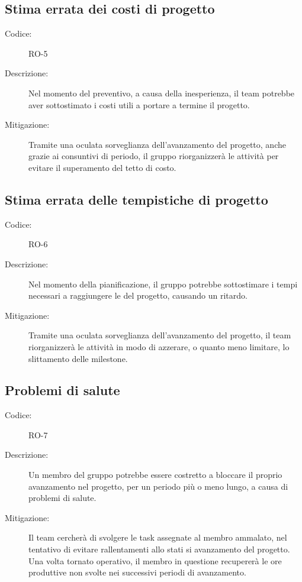 \subsection*{Stima errata dei costi di progetto}
\begin{description}
    \item[Codice:] RO-5
    \item[Descrizione:] Nel momento del preventivo, a causa della inesperienza, il team potrebbe aver sottostimato i costi utili a portare a termine il progetto.
    \item[Mitigazione:] Tramite una oculata sorveglianza dell'avanzamento del progetto, anche grazie ai consuntivi di periodo, il gruppo riorganizzerà le attività per evitare il superamento del tetto di costo.
\end{description}

\subsection*{Stima errata delle tempistiche di progetto}
\begin{description}
    \item[Codice:] RO-6
    \item[Descrizione:] Nel momento della pianificazione, il gruppo potrebbe sottostimare i tempi necessari a raggiungere le  del progetto, causando un ritardo.
    \item[Mitigazione:] Tramite una oculata sorveglianza dell'avanzamento del progetto, il team riorganizzerà le attività in modo di azzerare, o quanto meno limitare, lo slittamento delle milestone.
\end{description}

\subsection*{Problemi di salute}
\begin{description}
    \item[Codice:] RO-7
    \item[Descrizione:] Un membro del gruppo potrebbe essere costretto a bloccare il proprio avanzamento nel progetto, per un periodo più o meno lungo, a causa di problemi di salute.
    \item[Mitigazione:] Il team cercherà di svolgere le task assegnate al membro ammalato, nel tentativo di evitare rallentamenti allo stati si avanzamento del progetto. Una volta tornato operativo, il membro in questione recupererà le ore produttive non svolte nei successivi periodi di avanzamento.
\end{description}


